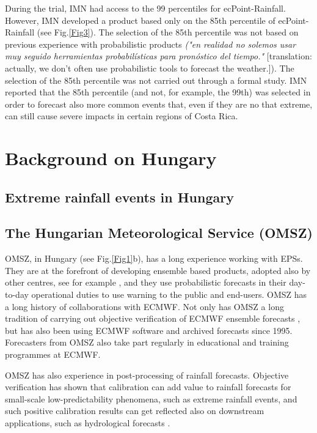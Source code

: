 \documentclass[twocol]{ametsocV5} %
\begin{document}
During the trial, IMN had access to the 99 percentiles for ecPoint-Rainfall. However, IMN developed a product based only on the 85th percentile of ecPoint-Rainfall (see Fig.\ref{Fig3}). The selection of the 85th percentile was not based on previous experience with probabilistic products \textit{("en realidad no solemos usar muy seguido herramientas probabilísticas para pronóstico del tiempo."} [translation: actually, we don't often use probabilistic tools to forecast the weather.]). The selection of the 85th percentile was not carried out through a formal study. IMN reported that the 85th percentile (and not, for example, the 99th) was selected in order to forecast also more common events that, even if they are no that extreme, can still cause severe impacts in certain regions of Costa Rica.



\section{Background on Hungary}

\subsection{Extreme rainfall events in Hungary}

\subsection{The Hungarian Meteorological Service (OMSZ)}
OMSZ, in Hungary (see Fig.\ref{Fig1}b), has a long experience working with EPSs. They are at the forefront of developing ensemble based products, adopted also by other centres, see for example \citet{Gascon2018}, and they use probabilistic forecasts in their day-to-day operational duties to use warning to the public and end-users. OMSZ has a long history of collaborations with ECMWF. Not only has OMSZ a long tradition of carrying out objective verification of ECMWF ensemble forecasts \citep{Hewson2020}, but has also been using ECMWF software and archived forecasts since 1995. Forecasters from OMSZ also take part regularly in educational and training programmes at ECMWF. \par
OMSZ has also experience in post-processing of rainfall forecasts. Objective verification has shown that calibration can add value to rainfall forecasts for small-scale low-predictability phenomena, such as extreme rainfall events, and such positive calibration results can get reflected also on downstream applications, such as hydrological forecasts \citep{Ihasz2018,Matrai2017}.
\end{document}
